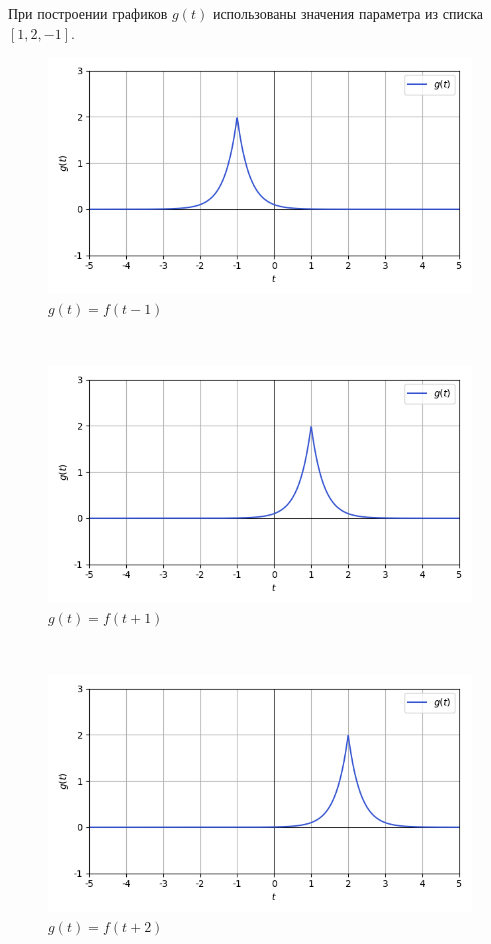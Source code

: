 \documentclass[a4paper]{article}
\begin{document}
При построении графиков $g(t)$ использованы значения параметра из списка $[1, 2, -1]$. 
\begin{figure}[H]
        \centering \includegraphics[width=\textwidth]{complex/graph_default/complex_graph_2_3_-1.png}
        \caption{$g(t) = f(t-1)$}
\end{figure}\noindent\
\begin{figure}[H]
        \centering \includegraphics[width=\textwidth]{complex/graph_default/complex_graph_2_3_1.png}
        \caption{$g(t) = f(t+1)$}
\end{figure}\noindent\
\begin{figure}[H]
        \centering \includegraphics[width=\textwidth]{complex/graph_default/complex_graph_2_3_2.png}
        \caption{$g(t) = f(t+2)$}
\end{figure}\noindent\
\end{document}
